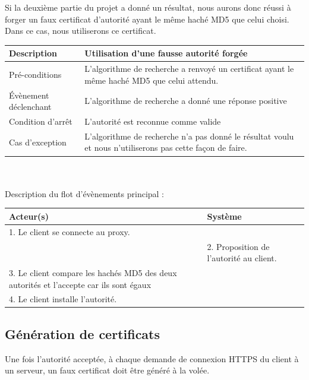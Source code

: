 \documentclass[a4paper,11pt,french]{article}
\begin{document}
Si la deuxième partie du projet a donné un résultat, nous aurons donc réussi à forger un faux certificat d'autorité ayant le même haché MD5 que celui choisi.
Dans ce cas, nous utiliserons ce certificat.

\begin{tabular}{|>{\columncolor[gray]{.8}}m{4cm}|m{12cm}|}
   \hline
   Description & Utilisation d'une fausse autorité forgée \\
   \hline
   Pré-conditions & L'algorithme de recherche a renvoyé un certificat ayant le même haché MD5 que celui attendu.
 \\
   \hline
   Évènement déclenchant & L'algorithme de recherche a donné une réponse positive \\
   \hline
   Condition d'arrêt & L'autorité est reconnue comme valide \\
   \hline
   Cas d'exception  &  L'algorithme de recherche n'a pas donné le résultat voulu et nous n'utiliserons pas cette  façon de faire. \\
   \hline   
\end{tabular}

~\\

~\\

Description du flot d'évènements principal :

\begin{tabular}{|m{8cm}|m{8cm}|}
   \hline
  \rowcolor[gray]{.8} Acteur(s) & Système \\
   \hline
   1. Le client se connecte au proxy. & \\
   \hline
    & 2. Proposition de l'autorité au client. \\
   \hline
      3. Le client compare les hachés MD5 des deux autorités et l'accepte car ils sont égaux & \\
   \hline
    4. Le client installe l'autorité. &  \\
   \hline
\end{tabular}

\subsection{Génération de certificats}

Une fois l'autorité acceptée, à chaque demande de connexion HTTPS du client à un serveur, un faux certificat doit être généré à la volée.
\end{document}
